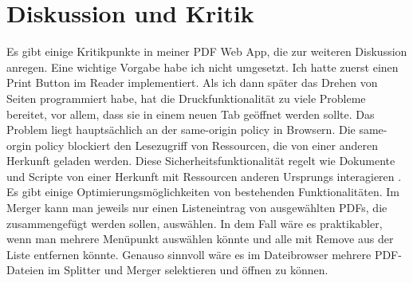 \chapter{Diskussion und Kritik}
Es gibt einige Kritikpunkte in meiner PDF Web App, die zur weiteren Diskussion anregen. Eine wichtige Vorgabe habe ich nicht umgesetzt. Ich hatte zuerst einen Print Button im Reader implementiert. Als ich dann später das Drehen von Seiten programmiert habe, hat die Druckfunktionalität zu viele Probleme bereitet, vor allem, dass sie in einem neuen Tab geöffnet werden sollte. Das Problem liegt hauptsächlich an der same-origin policy in Browsern. Die same-orgin policy blockiert den Lesezugriff von Ressourcen, die von einer anderen Herkunft geladen werden. Diese Sicherheitsfunktionalität regelt wie Dokumente und Scripte von einer Herkunft mit Ressourcen anderen Ursprungs interagieren \cite{same-origin}. Es gibt einige Optimierungsmöglichkeiten von bestehenden Funktionalitäten. Im Merger kann man jeweils nur einen Listeneintrag von ausgewählten PDFs, die zusammengefügt werden sollen, auswählen. In dem Fall wäre es praktikabler, wenn man mehrere Menüpunkt auswählen könnte und alle mit Remove aus der Liste entfernen könnte. Genauso sinnvoll wäre es im Dateibrowser mehrere PDF-Dateien im Splitter und Merger selektieren und öffnen zu können. \\
